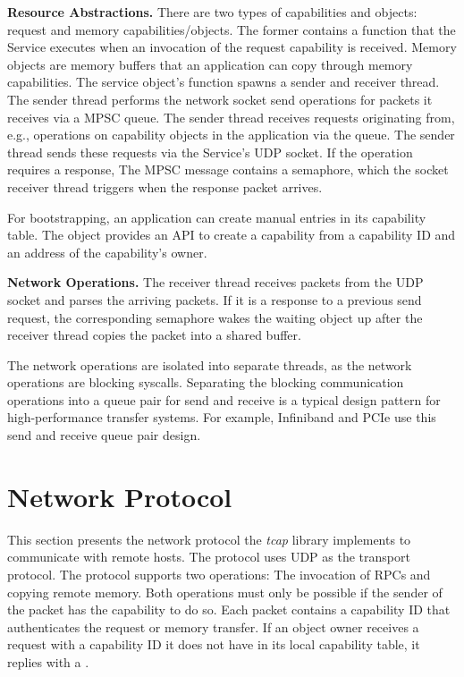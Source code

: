 \textbf{Resource Abstractions.}
There are two types of capabilities and objects: request and memory capabilities/objects. The former contains a function that the Service executes when an invocation of the request capability is received. Memory objects are memory buffers that an application can copy through memory capabilities. The service object's  function spawns a sender and receiver thread. The sender thread performs the network socket send operations for packets it receives via a \ac{MPSC} queue.
The sender thread receives requests originating from, e.g.\@, operations on capability objects in the application via the queue. The sender thread sends these requests via the Service's \ac{UDP} socket. If the operation requires a response, The \ac{MPSC} message contains a semaphore, which the socket receiver thread triggers when the response packet arrives.

For bootstrapping, an application can create manual entries in its capability table. The  object provides an \ac{API} to create a capability from a capability ID and an address of the capability's owner.

\textbf{Network Operations.}
The receiver thread receives packets from the \ac{UDP} socket and parses the arriving packets. If it is a response to a previous send request, the corresponding semaphore wakes the waiting object up after the receiver thread copies the packet into a shared buffer.

The network operations are isolated into separate threads, as the network operations are blocking syscalls. Separating the blocking communication operations into a queue pair for send and receive is a typical design pattern for high-performance transfer systems. For example, Infiniband and \ac{PCIe} use this send and receive queue pair design.

\section{Network Protocol}
This section presents the network protocol the \emph{tcap} library implements to communicate with remote hosts. The protocol uses \ac{UDP} as the transport protocol. The protocol supports two operations: The invocation of \acp{RPC} and copying remote memory. Both operations must only be possible if the sender of the packet has the capability to do so. Each packet contains a capability ID that authenticates the request or memory transfer. If an object owner receives a request with a capability ID it does not have in its local capability table, it replies with a .

